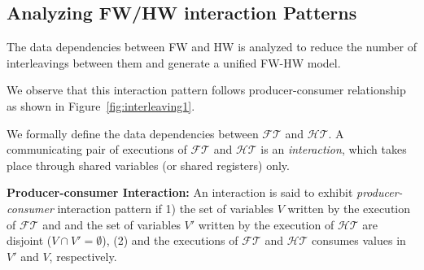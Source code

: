 \documentclass[sigconf]{acmart}
\newcommand{\Omit}[1]{}
\begin{document}
\Omit{
A state transition in HW can be described by a set of register updates,
defined by the next-state function, and assignment of non-deterministic 
values to external inputs. The state transition in the software netlist 
corresponds to updates to the variables in $Seq$ and explicit assignment 
of non-deterministic values to the input variables, $In$.
}

\subsection{Analyzing FW/HW interaction Patterns}
The data dependencies between FW and HW is analyzed 
to reduce the number of interleavings between them and 
generate a unified FW-HW model. 
\Omit{
Recall that a HW transaction $(\mathcal{HT})$ is in response to a FW transaction 
$(\mathcal{FT})$. Similarly, $\mathcal{FT}$ is in response to the 
inputs from $\mathcal{HT}$ or operating system or application level software. 
The specific interaction pattern between $\mathcal{FT}$ 
and $\mathcal{HT}$ is exploited to generate a 
unified FW-HW model, $\mathcal{PN}$, in C. 
}
We observe that this interaction pattern follows 
producer-consumer relationship as shown in 
Figure~\ref{fig:interleaving1}. 
\Omit{
In practice, a FW thread 
is mostly independent of the HW thread they interact with~\cite{hvc}.  
Specifically, a FW thread is only responsible for configuring the 
HW transactions by writing to memory mapped registers 
or polling the interrupt status register for data transmission or 
receiving incoming data packets. 
}
We formally define the data dependencies between $\mathcal{FT}$ 
and $\mathcal{HT}$. A communicating pair of executions of 
$\mathcal{FT}$ and $\mathcal{HT}$ is an {\em interaction}, which 
takes place through shared variables (or shared registers)
only.

\Omit{
\textbf{Producer:} 
$\mathcal{FT}$ (or $\mathcal{HT}$) is called a {\em producer} 
if it produces a data ($d$) that is independent of $\mathcal{HT}$ (or $\mathcal{FT}$). 
Thus, the interleavings between $\mathcal{FT}$ and $\mathcal{HT}$ 
can be avoided to compute $d$. 
}

\textbf{Producer-consumer Interaction:}
%
An interaction is said to exhibit {\em producer-consumer}
interaction pattern if 1) the set of variables $V$ written by 
the execution of $\mathcal{FT}$ and and the set of variables 
$V'$ written by the execution of $\mathcal{HT}$ are disjoint 
($V \cap V' = \emptyset$), (2) and the executions 
of $\mathcal{FT}$ and $\mathcal{HT}$ consumes values 
in $V'$ and $V$, respectively.
\end{document}
